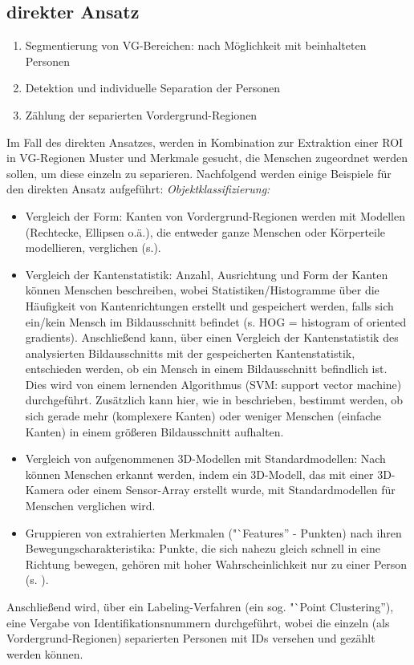 \subsection{direkter Ansatz}
\begin{enumerate}
\item Segmentierung von VG-Bereichen: nach Möglichkeit mit beinhalteten Personen
\item Detektion und individuelle Separation der Personen
\item Zählung der separierten Vordergrund-Regionen
\end{enumerate}

Im Fall des direkten Ansatzes, werden in Kombination zur Extraktion einer ROI in VG-Regionen Muster und Merkmale gesucht, die Menschen zugeordnet werden sollen, um diese einzeln zu separieren. 
\newpage
Nachfolgend werden einige Beispiele für den direkten Ansatz aufgeführt:
\vskip 10pt
\emph{Objektklassifizierung:}
\begin{itemize}

\item Vergleich der Form: Kanten von Vordergrund-Regionen werden mit Modellen (Rechtecke, Ellipsen o.ä.), die entweder ganze Menschen oder Körperteile modellieren, verglichen (s.\cite{rittscher}).

\item Vergleich der Kantenstatistik: Anzahl, Ausrichtung und Form der Kanten können Menschen beschreiben, wobei Statistiken/Histogramme über die Häufigkeit von Kantenrichtungen erstellt und gespeichert werden, falls sich ein/kein Mensch im Bildausschnitt befindet (s. HOG = histogram of oriented gradients). Anschließend kann, über einen Vergleich der Kantenstatistik des analysierten Bildausschnitts mit der gespeicherten Kantenstatistik, entschieden werden, ob ein Mensch in einem Bildausschnitt befindlich ist. Dies wird von einem lernenden Algorithmus (SVM: support vector machine) durchgeführt. Zusätzlich kann hier, wie in \cite{loy2013crowd} beschrieben, bestimmt werden, ob sich gerade mehr (komplexere Kanten) oder weniger Menschen (einfache Kanten) in einem größeren Bildausschnitt aufhalten.

\item Vergleich von aufgenommenen 3D-Modellen mit Standardmodellen: Nach \cite{zhao} können Menschen erkannt werden, indem ein 3D-Modell, das mit einer 3D-Kamera oder einem Sensor-Array erstellt wurde, mit Standardmodellen für Menschen verglichen wird.

\item Gruppieren von extrahierten Merkmalen ("`Features'' - \zb Punkten) nach ihren Bewegungscharakteristika: Punkte, die sich nahezu gleich schnell in eine Richtung bewegen, gehören mit hoher Wahrscheinlichkeit nur zu einer Person (s. \cite{brostow}).

\end{itemize}
\vskip 5pt
Anschließend wird, über ein Labeling-Verfahren (\zb ein sog. "`Point Clustering''), eine Vergabe von Identifikationsnummern durchgeführt, wobei die einzeln (als Vordergrund-Regionen) separierten Personen mit IDs versehen und gezählt werden können.

